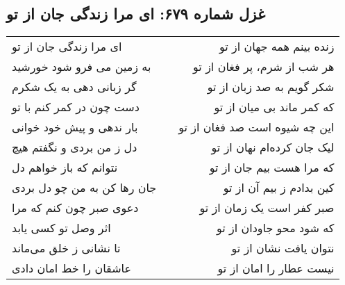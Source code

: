 \begin{center}
\section*{غزل شماره ۶۷۹: ای مرا زندگی جان از تو}
\label{sec:679}
\begin{longtable}{l p{0.5cm} r}
ای مرا زندگی جان از تو
&&
زنده بینم همه جهان از تو
\\
به زمین می فرو شود خورشید
&&
هر شب از شرم، پر فغان از تو
\\
گر زبانی دهی به یک شکرم
&&
شکر گویم به صد زبان از تو
\\
دست چون در کمر کنم با تو
&&
که کمر ماند بی میان از تو
\\
بار ندهی و پیش خود خوانی
&&
این چه شیوه است صد فغان از تو
\\
دل ز من بردی و نگفتم هیچ
&&
لیک جان کرده‌ام نهان از تو
\\
نتوانم که باز خواهم دل
&&
که مرا هست بیم جان از تو
\\
جان رها کن به من چو دل بردی
&&
کین بدادم ز بیم آن از تو
\\
دعوی صبر چون کنم که مرا
&&
صبر کفر است یک زمان از تو
\\
اثر وصل تو کسی یابد
&&
که شود محو جاودان از تو
\\
تا نشانی ز خلق می‌ماند
&&
نتوان یافت نشان از تو
\\
عاشقان را خط امان دادی
&&
نیست عطار را امان از تو
\\
\end{longtable}
\end{center}
